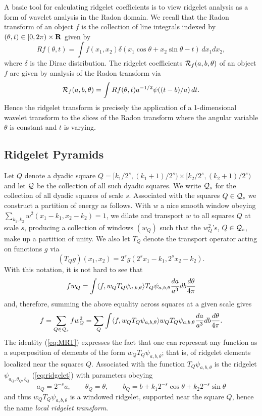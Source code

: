 A basic tool for calculating ridgelet coefficients is to view ridgelet
analysis as a form of wavelet analysis in the Radon domain. We recall
that the Radon transform of an object $f$ is the collection of line
integrals indexed by $(\theta,t) \in [0,2\pi) \times {\bf R}$ given by
\begin{equation}
      \label{eq:Radon}
      Rf(\theta,t) = \int f(x_1,x_2)
\delta(x_1 \cos\theta + x_2 \sin\theta - t)\, dx_1 dx_2,
\end{equation}
where $\delta$ is the Dirac distribution. The ridgelet coefficients
${\cal R}_f(a,b,\theta)$ of an object $f$ are given by analysis of the Radon
transform via
\[
{\cal R}_f(a,b,\theta) = \int Rf(\theta,t) a^{-1/2} \psi((t - b)/a) \, dt.
\]
Hence the ridgelet transform is precisely the application of a
1-dimensional wavelet transform to the slices of the Radon transform
where the angular variable $\theta$ is constant and $t$ is varying.

\subsection{Ridgelet Pyramids}
\label{sec:pyramid}

Let $Q$ denote a dyadic square $Q = [k_1/2^s,(k_1+1)/2^s) \times
[k_2/2^s, (k_2+1)/2^s)$ and let ${\cal Q}$ be the collection of all
such dyadic squares. We write ${\cal Q}_s$ for the collection of all
dyadic squares of scale $s$. Associated with the squares
$Q \in {\cal Q}_s$ we construct a partition of energy
as follows. With $w$ a nice smooth window obeying
$ \sum_{k_1,k_2} w^2(x_1-k_1 , x_2 -k_2 ) = 1$,
we dilate and transport $w$ to all squares $Q$ at scale $s$,
producing a collection of windows $(w_Q)$ such that the
$w_Q^2$'s, $Q \in {\cal Q}_s$, make up a partition of unity.
We also let $T_Q$
denote the transport operator acting on
functions $g$ via
\[
(T_Q g)(x_1,x_2) = 2^s g(2^s x_1 - k_1,2^s x_2 - k_2).
\]
With this notation, it is not hard to see that
\[
f w_Q = \int \langle f, w_Q T_Q {\psi}_{a,b,\theta} \rangle
     T_Q {\psi}_{a,b,\theta} \frac{da}{a^3} db
\frac{d\theta}{4\pi}
\]
and, therefore,
summing the above equality across squares at a given scale gives
\begin{equation}
      \label{eq:MRT}
f = \sum_{Q \in {\cal Q}_s} f w_Q^2 = \sum_Q \int \langle f, w_Q T_Q
{\psi}_{a,b,\theta} \rangle w_Q T_Q {\psi}_{a,b,\theta} \frac{da}{a^3} db
\frac{d\theta}{4\pi}.
\end{equation}
The identity (\ref{eq:MRT}) expresses the fact that one can represent
any function as a superposition of elements of the form $w_Q T_Q
{\psi}_{a,b,\theta}$; that is, of ridgelet elements localized near the
squares $Q$. Associated with the 
function $T_Q {\psi}_{a,b,\theta}$ is the ridgelet
$\psi_{a_Q,\theta_Q,b_Q}$ (\ref{eq:ridgelet}) with parameters obeying
\[
a_Q = 2^{-s} a, \quad \quad \theta_Q = \theta, \quad \quad b_Q = b +
k_1 2^{-s} \cos\theta + k_2 2^{-s}\sin\theta
\]
and thus $w_Q T_Q {\psi}_{a,b,\theta}$ is a windowed ridgelet,
supported near the square $Q$, hence the name {\em local ridgelet
      transform}.

